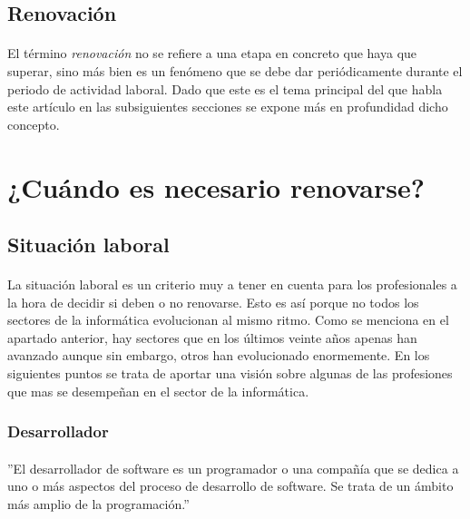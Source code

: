 \documentclass[12pt, a4paper]{report}
\begin{document}
                   
        \subsection{Renovación}
        	\paragraph{}
           	El término \emph{renovación} no se refiere a una etapa en concreto que haya que superar, sino más bien es un fenómeno que se debe dar periódicamente durante el periodo de actividad laboral. Dado que este es el tema principal del que habla este artículo en las subsiguientes secciones se expone más en profundidad dicho concepto.
            
    \section{¿Cuándo es necesario renovarse?}
    	\subsection{Situación laboral}
        	\paragraph{}
            La situación laboral es un criterio muy a tener en cuenta para los profesionales a la hora de decidir si deben o no renovarse. Esto es así porque no todos los sectores de la informática evolucionan al mismo ritmo. Como se menciona en el apartado anterior, hay sectores que en los últimos veinte años apenas han avanzado aunque sin embargo, otros han evolucionado enormemente. En los siguientes puntos se trata de aportar una visión sobre algunas de las profesiones que mas se desempeñan en el sector de la informática.
            
             \subsubsection{Desarrollador}
        		\paragraph{}
                ''El desarrollador de software es un programador o una compañía que se dedica a uno o más aspectos del proceso de desarrollo de software. Se trata de un ámbito más amplio de la programación.''\cite{wikipedia:desarrollador}
                
\end{document}
